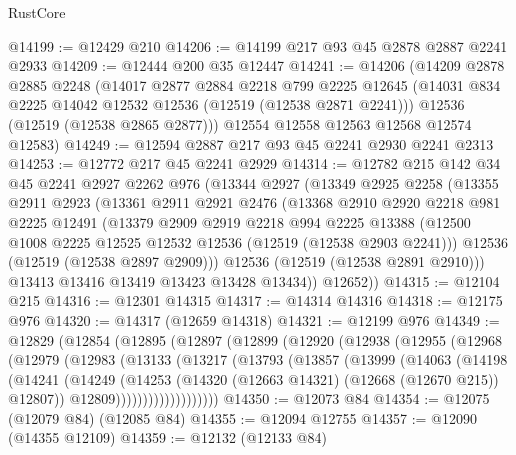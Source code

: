 \begin{lexlean}{RustCore}
\begin{coremodule}
@14199 := @12429 @210
@14206 := @14199 @217 @93 @45 @2878 @2887 @2241 @2933
@14209 := @12444 @200 @35 @12447
@14241 := @14206
    (@14209
      @2878
      @2885
      @2248
      (@14017
        @2877
        @2884
        @2218
        @799
        @2225
        @12645
        (@14031 @834 @2225 @14042 @12532 @12536 (@12519 (@12538 @2871 @2241)))
        @12536
        (@12519 (@12538 @2865 @2877)))
      @12554
      @12558
      @12563
      @12568
      @12574
      @12583)
@14249 := @12594 @2887 @217 @93 @45 @2241 @2930 @2241 @2313
@14253 := @12772 @217 @45 @2241 @2929
@14314 := @12782
    @215
    @142
    @34
    @45
    @2241
    @2927
    @2262
    @976
    (@13344
      @2927
      (@13349
        @2925
        @2258
        (@13355
          @2911
          @2923
          (@13361
            @2911
            @2921
            @2476
            (@13368
              @2910
              @2920
              @2218
              @981
              @2225
              @12491
              (@13379
                @2909
                @2919
                @2218
                @994
                @2225
                @13388
                (@12500 @1008 @2225 @12525 @12532 @12536 (@12519 (@12538 @2903 @2241)))
                @12536
                (@12519 (@12538 @2897 @2909)))
              @12536
              (@12519 (@12538 @2891 @2910)))
            @13413
            @13416
            @13419
            @13423
            @13428
            @13434))
        @12652))
@14315 := @12104 @215
@14316 := @12301 @14315
@14317 := @14314 @14316
@14318 := @12175 @976
@14320 := @14317 (@12659 @14318)
@14321 := @12199 @976
@14349 := @12829
    (@12854
      (@12895
        (@12897
          (@12899
            (@12920
              (@12938
                (@12955
                  (@12968
                    (@12979
                      (@12983
                        (@13133
                          (@13217
                            (@13793
                              (@13857
                                (@13999
                                  (@14063
                                    (@14198
                                      (@14241
                                        (@14249
                                          (@14253
                                            (@14320 (@12663 @14321) (@12668 (@12670 @215)) @12807))
                                          @12809)))))))))))))))))))
@14350 := @12073 @84
@14354 := @12075 (@12079 @84) (@12085 @84)
@14355 := @12094 @12755
@14357 := @12090 (@14355 @12109)
@14359 := @12132 (@12133 @84)

\end{coremodule}
\end{lexlean}
